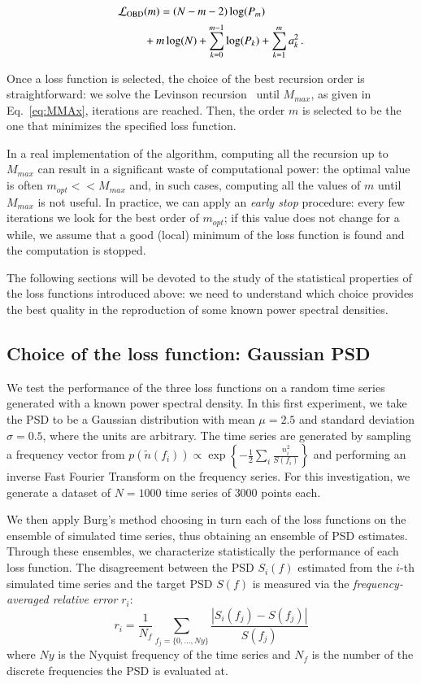 \documentclass{aa}
\begin{document}
\begin{itemize}
   \begin{align}
        \mathcal{L}_{\rm OBD}&(m) = (N - m - 2) \log(P_m) \nonumber\\
        &+ m \log(N) + \sum_{k = 0}^{m-1} \log(P_k) + \sum_{k = 1}^{m} a_k^2\,.
    \end{align}
\end{itemize}

Once a loss function is selected, the choice of the best recursion order is straightforward: we solve the Levinson recursion~\citep{doi:10.1002/sapm1946251261} until $M_{max}$, as given in Eq.~\eqref{eq:MMAx}, iterations are reached. Then, the order $m$ is selected to be the one that minimizes the specified loss function.

In a real implementation of the algorithm, computing all the recursion up to $M_{max}$ can result in a significant waste of computational power: the optimal value is often $m_{opt} << M_{max}$ and, in such cases, computing all the values of $m$ until $M_{max}$ is not useful.
In practice, we can apply an \textit{early stop} procedure: every few iterations we look for the best order of $m_{opt}$; if this value does not change for a while, we assume that a good (local) minimum of the loss function is found and the computation is stopped.

The following sections will be devoted to the study of the statistical properties of the loss functions introduced above: we need to understand which choice provides the best quality in the reproduction of some known power spectral densities. 

\subsection{Choice of the loss function: Gaussian PSD} \label{sec:arp_validation}
We test the performance of the three loss functions on a random time series generated with a known power spectral density.
In this first experiment, we take the PSD to be a Gaussian distribution with mean $\mu = 2.5$ and standard deviation $\sigma = 0.5$, where the units are arbitrary.
The time series are generated by sampling a frequency vector from ${p(\tilde{n}(f_i)) \propto \exp{\left\{-\frac{1}{2}\sum_i\frac{n_i ^2}{S(f_i)}\right\}}}$ and performing an inverse Fast Fourier Transform on the frequency series. 
For this investigation, we generate a dataset of $N=1000$ time series of $3000$ points each.

We then apply Burg's method choosing in turn each of the loss functions on the ensemble of simulated time series, 
thus obtaining an ensemble of PSD estimates. Through these ensembles, we characterize statistically the performance of each loss function.
The disagreement between the PSD $S_i(f)$ estimated from the $i$-th simulated time series and the target PSD $S(f)$ is measured via 
the \textit{frequency-averaged relative error} $r_i$:
\begin{equation}\label{eq:freq_error}
	r_i = \frac{1}{N_f}\sum_{f_j=\{0, \hdots , Ny\}} \frac{|S_i(f_j) - S(f_j)|}{S(f_j)}
\end{equation}
where $Ny$ is the Nyquist frequency of the time series and $N_f$ is the number of the discrete frequencies the PSD is evaluated at.
\end{document}
